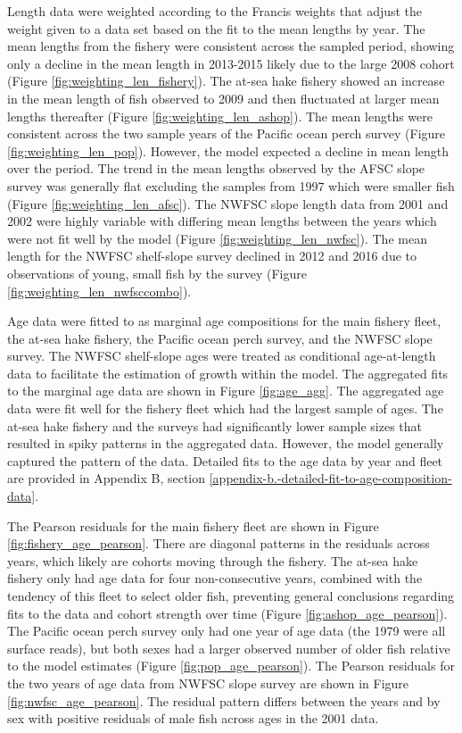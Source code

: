 \documentclass[12pt,]{article}
\begin{document}
Length data were weighted according to the Francis weights that adjust
the weight given to a data set based on the fit to the mean lengths by
year. The mean lengths from the fishery were consistent across the
sampled period, showing only a decline in the mean length in 2013-2015
likely due to the large 2008 cohort (Figure
\ref{fig:weighting_len_fishery}). The at-sea hake fishery showed an
increase in the mean length of fish observed to 2009 and then fluctuated
at larger mean lengths thereafter (Figure
\ref{fig:weighting_len_ashop}). The mean lengths were consistent across
the two sample years of the Pacific ocean perch survey (Figure
\ref{fig:weighting_len_pop}). However, the model expected a decline in
mean length over the period. The trend in the mean lengths observed by
the AFSC slope survey was generally flat excluding the samples from 1997
which were smaller fish (Figure \ref{fig:weighting_len_afsc}). The NWFSC
slope length data from 2001 and 2002 were highly variable with differing
mean lengths between the years which were not fit well by the model
(Figure \ref{fig:weighting_len_nwfsc}). The mean length for the NWFSC
shelf-slope survey declined in 2012 and 2016 due to observations of
young, small fish by the survey (Figure
\ref{fig:weighting_len_nwfsccombo}).

Age data were fitted to as marginal age compositions for the main
fishery fleet, the at-sea hake fishery, the Pacific ocean perch survey,
and the NWFSC slope survey. The NWFSC shelf-slope ages were treated as
conditional age-at-length data to facilitate the estimation of growth
within the model. The aggregated fits to the marginal age data are shown
in Figure \ref{fig:age_agg}. The aggregated age data were fit well for
the fishery fleet which had the largest sample of ages. The at-sea hake
fishery and the surveys had significantly lower sample sizes that
resulted in spiky patterns in the aggregated data. However, the model
generally captured the pattern of the data. Detailed fits to the age
data by year and fleet are provided in Appendix B, section
\ref{appendix-b.-detailed-fit-to-age-composition-data}.

The Pearson residuals for the main fishery fleet are shown in Figure
\ref{fig:fishery_age_pearson}. There are diagonal patterns in the
residuals across years, which likely are cohorts moving through the
fishery. The at-sea hake fishery only had age data for four
non-consecutive years, combined with the tendency of this fleet to
select older fish, preventing general conclusions regarding fits to the
data and cohort strength over time (Figure \ref{fig:ashop_age_pearson}).
The Pacific ocean perch survey only had one year of age data (the 1979
were all surface reads), but both sexes had a larger observed number of
older fish relative to the model estimates (Figure
\ref{fig:pop_age_pearson}). The Pearson residuals for the two years of
age data from NWFSC slope survey are shown in Figure
\ref{fig:nwfsc_age_pearson}. The residual pattern differs between the
years and by sex with positive residuals of male fish across ages in the
2001 data.
\end{document}
